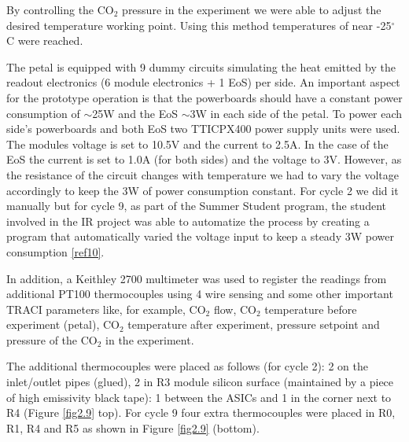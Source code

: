 		By controlling the CO$_{2}$ pressure in the experiment we were able to adjust the desired temperature working point. Using this method temperatures of near -25\space$^{\circ}$C were reached.
		
		The petal is equipped with 9 dummy circuits simulating the heat emitted by the readout electronics (6 module electronics + 1 EoS) per side. An important aspect for the prototype operation is that the powerboards should have a constant power consumption of $\sim$25W and the EoS $\sim$3W in each side of the petal. To power each side's powerboards and both EoS two TTICPX400 power supply units were used. The modules voltage is set to 10.5V and the current to 2.5A. In the case of the EoS the current is set to 1.0A (for both sides) and the voltage to 3V. However, as the resistance of the circuit changes with temperature we had to vary the voltage accordingly to keep the 3W of power consumption constant. For cycle 2 we did it manually but for cycle 9, as part of the Summer Student program, the student involved in the IR project was able to automatize the process by creating a program that automatically varied the voltage input to keep a steady 3W power consumption \ref{ref10}.
		
		In addition, a Keithley 2700 multimeter was used to register the readings from additional PT100 thermocouples using 4 wire sensing and some other important TRACI parameters like, for example, CO$_{2}$ flow, CO$_{2}$ temperature before experiment (petal), CO$_{2}$ temperature after experiment, pressure setpoint and pressure of the CO$_{2}$ in the experiment.
		
		The additional thermocouples were placed as follows (for cycle 2): 2 on the inlet/outlet pipes (glued), 2 in R3 module silicon surface (maintained by a piece of high emissivity black tape): 1 between the ASICs and 1 in the corner next to R4 (Figure \ref{fig2.9} top). For cycle 9 four extra thermocouples were placed in R0, R1, R4 and R5 as shown in Figure \ref{fig2.9} (bottom).
		
